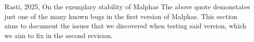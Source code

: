 {Rasti, 2025, On the exemplary stability of Malphas}
\vspace{\baselineskip}
The above quote demonstates just one of the many known bugs in the first version of Malphas.
This section aims to document the issues that we discovered when testing said version, which we aim to fix in the second revision.
